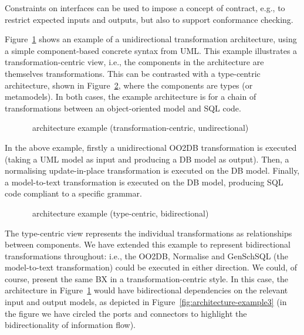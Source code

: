 Constraints on interfaces can be used to impose a concept of contract, e.g., to restrict expected inputs and outputs, but also to support conformance checking.

Figure~\ref{fig:architecture-example1} shows an example of a unidirectional transformation architecture, using a simple component-based concrete syntax from UML. This example illustrates a transformation-centric view, i.e., the components in the architecture are themselves transformations. This can be contrasted with a type-centric architecture, shown in Figure~\ref{fig:architecture-example2}, where the components are types (or metamodels). In both cases, the example architecture is for a chain of transformations between an object-oriented model and SQL code.

\begin{figure}[htbp]
\caption{\transml\ architecture example (transformation-centric, undirectional)}
\label{fig:architecture-example1}
\end{figure}

In the above example, firstly a unidirectional OO2DB transformation is executed (taking a UML model as input and producing a DB model as output). Then, a normalising update-in-place transformation is executed on the DB model. Finally, a model-to-text transformation is executed on the DB model, producing SQL code compliant to a specific grammar.

\begin{figure}[htbp]
\caption{\transml\ architecture example (type-centric, bidirectional)}
\label{fig:architecture-example2}
\end{figure}

The type-centric view represents the individual transformations as relationships between components. We have extended this example to represent bidirectional transformations throughout: i.e., the OO2DB, Normalise and GenSchSQL (the model-to-text transformation) could be executed in either direction.  We could, of course, present the same BX in a transformation-centric style. In this case, the architecture in Figure~\ref{fig:architecture-example1} would have bidirectional dependencies on the relevant input and output models, as depicted 
in Figure~\ref{fig:architecture-example3} (in the figure we have circled the ports and connectors to highlight the bidirectionality of information flow).

